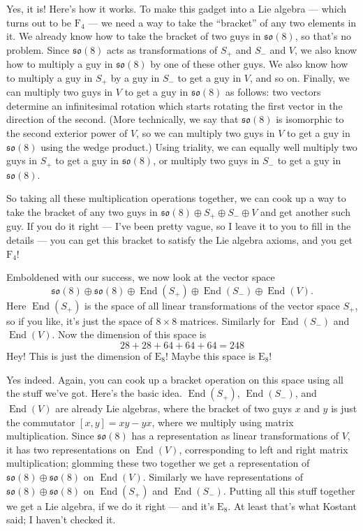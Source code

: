 \documentclass{article}
\begin{document}
Yes, it is! Here's how it works. To make this gadget into a Lie algebra
--- which turns out to be \(\mathrm{F}_4\) --- we need a way to take the
``bracket'' of any two elements in it. We already know how to take the
bracket of two guys in \(\mathfrak{so}(8)\), so that's no problem. Since
\(\mathfrak{so}(8)\) acts as transformations of \(S_+\) and \(S_-\) and
\(V\), we also know how to multiply a guy in \(\mathfrak{so}(8)\) by one
of these other guys. We also know how to multiply a guy in \(S_+\) by a
guy in \(S_-\) to get a guy in \(V\), and so on. Finally, we can
multiply two guys in \(V\) to get a guy in \(\mathfrak{so}(8)\) as
follows: two vectors determine an infinitesimal rotation which starts
rotating the first vector in the direction of the second. (More
technically, we say that \(\mathfrak{so}(8)\) is isomorphic to the
second exterior power of \(V\), so we can multiply two guys in \(V\) to
get a guy in \(\mathfrak{so}(8)\) using the wedge product.) Using
triality, we can equally well multiply two guys in \(S_+\) to get a guy
in \(\mathfrak{so}(8)\), or multiply two guys in \(S_-\) to get a guy in
\(\mathfrak{so}(8)\).

So taking all these multiplication operations together, we can cook up a
way to take the bracket of any two guys in
\(\mathfrak{so}(8)\oplus S_+\oplus S_-\oplus V\) and get another such
guy. If you do it right --- I've been pretty vague, so I leave it to you
to fill in the details --- you can get this bracket to satisfy the Lie
algebra axioms, and you get \(\mathrm{F}_4\)!

Emboldened with our success, we now look at the vector space
\[\mathfrak{so}(8)\oplus\mathfrak{so}(8)\oplus\operatorname{End}(S_+)\oplus\operatorname{End}(S_-)\oplus\operatorname{End}(V).\]
Here \(\operatorname{End}(S_+)\) is the space of all linear
transformations of the vector space \(S_+\), so if you like, it's just
the space of \(8\times8\) matrices. Similarly for
\(\operatorname{End}(S_-)\) and \(\operatorname{End}(V)\). Now the
dimension of this space is \[28+28+64+64+64=248\] Hey! This is just the
dimension of \(\mathrm{E}_8\)! Maybe this space is \(\mathrm{E}_8\)!

Yes indeed. Again, you can cook up a bracket operation on this space
using all the stuff we've got. Here's the basic idea.
\(\operatorname{End}(S_+)\), \(\operatorname{End}(S_-)\), and
\(\operatorname{End}(V)\) are already Lie algebras, where the bracket of
two guys \(x\) and \(y\) is just the commutator \([x,y]=xy-yx\), where
we multiply using matrix multiplication. Since \(\mathfrak{so}(8)\) has
a representation as linear transformations of \(V\), it has two
representations on \(\operatorname{End}(V)\), corresponding to left and
right matrix multiplication; glomming these two together we get a
representation of \(\mathfrak{so}(8)\oplus\mathfrak{so}(8)\) on
\(\operatorname{End}(V)\). Similarly we have representations of
\(\mathfrak{so}(8)\oplus\mathfrak{so}(8)\) on
\(\operatorname{End}(S_+)\) and \(\operatorname{End}(S_-)\). Putting all
this stuff together we get a Lie algebra, if we do it right --- and it's
\(\mathrm{E}_8\). At least that's what Kostant said; I haven't checked
it.
\end{document}
